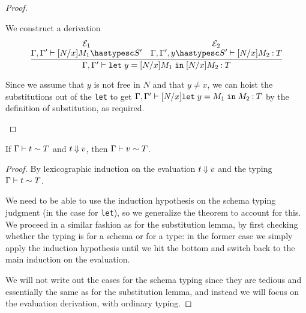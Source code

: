 \documentclass[11pt]{article}
\begin{document}
\begin{enumerate}
\begin{proof}
\begin{description}
\begin{description}
              We construct a derivation
              \begin{equation*}
                \infer{
                  \Gamma, \Gamma^\prime
                  \proves \mathtt{let}\; y = [N/x]M_1 \;\mathtt{in}\; [N/x]M_2
                  \hastype T
                }{
                  \deduce[\mathcal{E}_1]{
                    \Gamma, \Gamma^\prime \proves [N/x]M_1 \hastypesc S^\prime
                  }{}
                  &
                  \deduce[\mathcal{E}_2]{
                    \Gamma, \Gamma^\prime, y \hastypesc S^\prime \proves [N/x]M_2
                    \hastype T
                  }{}
                }
              \end{equation*}

              Since we assume that $y$ is not free in $N$ and that $y \neq x$, we
              can hoist the substitutions out of the \texttt{let} to get
              $
              \Gamma, \Gamma^\prime
              \vdash [N/x] \mathtt{let}\; y = M_1 \;\mathtt{in}\; M_2
              \mathbin{:} T
              $
              by the definition of substitution, as required.
          \end{description}
      \end{description}
    \end{proof}

    \begin{prop}
      If $\Gamma \vdash t \sim T$ and $t \mathbin{\Downarrow} v$,
      then $\Gamma \vdash v \sim T$.
    \end{prop}

    \begin{proof}
      By lexicographic induction on the evaluation $t \mathbin{\Downarrow} v$
      and the typing $\Gamma \vdash t \sim T$.

      We need to be able to use the induction hypothesis on the schema typing
      judgment (in the case for \texttt{let}), so we generalize the theorem to
      account for this. We proceed in a similar fashion as for the substitution
      lemma, by first checking whether the typing is for a schema or for a
      type: in the former case we simply apply the induction hypothesis until
      we hit the bottom and switch back to the main induction on the
      evaluation.

      We will not write out the cases for the schema typing since they are
      tedious and essentially the same as for the substitution lemma, and
      instead we will focus on the evaluation derivation, with ordinary typing.


\end{proof}
\end{enumerate}
\end{document}
